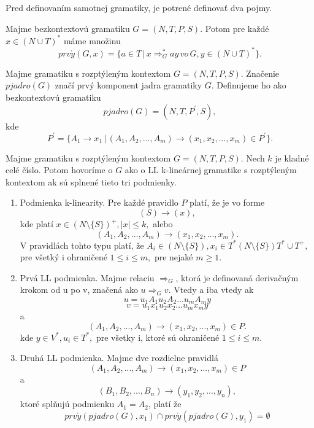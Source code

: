 Pred definovaním samotnej gramatiky, je potrené definovať dva pojmy.

\begin{definition}
Majme bezkontextovú gramatiku $G = (N, T, P, S)$. Potom pre každé $x \in (N \cup T)^*$ máme množinu $$prv\acute{y}(G,x) = \{a \in T \, | \, x \Rightarrow^*_G ay \, vo \, G, y \in (N \cup T)^*\}.$$ 
\end{definition}

\begin{definition}
Majme gramatiku s rozptýleným kontextom $G = (N, T, P, S)$. Značenie $pjadro(G)$ značí prvý komponent jadra gramatiky $G$. Definujeme ho ako bezkontextovú gramatiku $$pjadro(G) = (N,T,P^\prime,S),$$ kde $$P^\prime = \{A_1 \rightarrow x_1 \, | \, (A_1, A_2, ..., A_m) \rightarrow (x_1, x_2, ..., x_m) \in P^\prime\}.$$
\end{definition}

\begin{definition}
\label{def:ll}
Majme gramatiku s rozptýleným kontextom $G = (N, T, P, S)$. Nech $k$ je kladné celé číslo. Potom hovoríme o $G$ ako o LL k-lineárnej gramatike s rozptýleným kontextom ak sú splnené tieto tri podmienky. 
\end{definition}

\begin{enumerate}[label=\arabic*)]
    \item Podmienka k-linearity. Pre každé pravidlo $P$ platí, že je vo forme $$(S) \rightarrow (x),$$ kde platí $x \in (N \setminus \{S\})^+, |x| \leq k,$ alebo $$(A_1,A_2, ..., A_m) \rightarrow (x_1, x_2, ..., x_m).$$ V pravidlách tohto typu platí, že $A_i \in (N \setminus \{S\}), x_i \in T^*(N \setminus \{S\})T^* \cup T^+,$ pre všetký i ohraničené $1 \leq i \leq m, $ pre nejaké $m \geq 1.$
    
    \item Prvá LL podmienka. Majme relaciu $\Rightarrow_G$, ktorá je definovaná derivačným krokom od u po v, značená ako $u \Rightarrow_G v$. Vtedy a iba vtedy ak $$u = u_1A_1u_2A_2...u_mA_my$$ $$v = u_1x_1u_2x_2...u_mx_my$$ a $$(A_1,A_2, ...,A_m) \rightarrow (x_1,x_2, ..., x_m) \in P.$$ kde $y \in V^*, u_i \in T^*,$ pre všetky i, ktoré sú ohraničené $1 \leq i \leq m.$ 
    
    \item Druhá LL podmienka. Majme dve rozdielne pravidlá $$(A_1,A_2, ...,A_m) \rightarrow (x_1, x_2, ..., x_m) \in P$$ a $$(B_1, B_2, ..., B_n) \rightarrow (y_1, y_2, ..., y_n),$$ ktoré splňujú podmienku $A_1 = A_2$, platí že $$prv\acute{y}(pjadro(G),x_1) \cap prv\acute{y}(pjadro(G),y_1) = \emptyset$$
\end{enumerate}

